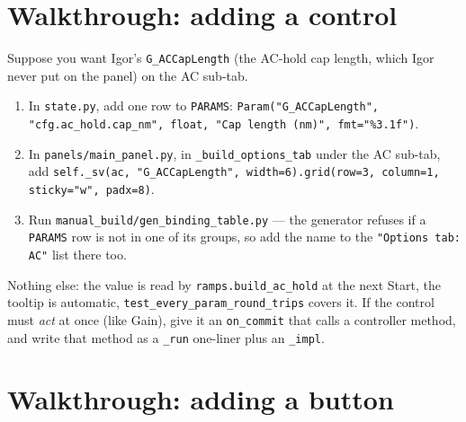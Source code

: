 \section{Walkthrough: adding a control}

Suppose you want Igor's \texttt{G\_\discretionary{}{}{}ACCap\discretionary{}{}{}Length} (the AC-hold cap length, which Igor never put on the panel) on the AC sub-tab.

\begin{enumerate}[leftmargin=*]
\item In \texttt{state.\discretionary{}{}{}py}, add one row to \texttt{PARAMS}: \texttt{Param("G\_\discretionary{}{}{}ACCap\discretionary{}{}{}Length",\discretionary{}{}{} "cfg.\discretionary{}{}{}ac\_\discretionary{}{}{}hold.\discretionary{}{}{}cap\_\discretionary{}{}{}nm",\discretionary{}{}{} float,\discretionary{}{}{} "Cap length (nm)",\discretionary{}{}{} fmt="\%3.\discretionary{}{}{}1f")}.
\item In \texttt{panels/\discretionary{}{}{}main\_\discretionary{}{}{}panel.\discretionary{}{}{}py}, in \texttt{\_\discretionary{}{}{}build\_\discretionary{}{}{}options\_\discretionary{}{}{}tab} under the AC sub-tab, add \texttt{self.\discretionary{}{}{}\_\discretionary{}{}{}sv(ac,\discretionary{}{}{} "G\_\discretionary{}{}{}ACCap\discretionary{}{}{}Length",\discretionary{}{}{} width=6).\discretionary{}{}{}grid(row=3,\discretionary{}{}{} column=1,\discretionary{}{}{} sticky="w",\discretionary{}{}{} padx=8)}.
\item Run \texttt{manual\_\discretionary{}{}{}build/\discretionary{}{}{}gen\_\discretionary{}{}{}binding\_\discretionary{}{}{}table.\discretionary{}{}{}py} --- the generator refuses if a \texttt{PARAMS} row is not in one of its groups, so add the name to the \texttt{"Options tab: AC"} list there too.
\end{enumerate}

Nothing else: the value is read by \texttt{ramps.\discretionary{}{}{}build\_\discretionary{}{}{}ac\_\discretionary{}{}{}hold} at the next Start, the tooltip is automatic, \texttt{test\_\discretionary{}{}{}every\_\discretionary{}{}{}param\_\discretionary{}{}{}round\_\discretionary{}{}{}trips} covers it. If the control must \emph{act} at once (like Gain), give it an \texttt{on\_\discretionary{}{}{}commit} that calls a controller method, and write that method as a \texttt{\_\discretionary{}{}{}run} one-liner plus an \texttt{\_\discretionary{}{}{}impl}.

\section{Walkthrough: adding a button}

